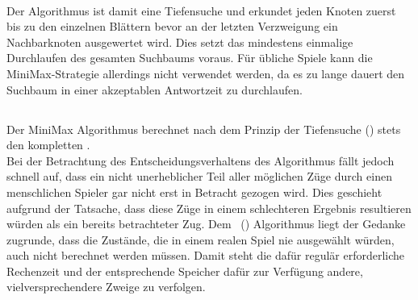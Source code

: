 \vspace{0.5cm}\\ Der Algorithmus ist damit eine Tiefensuche und erkundet jeden Knoten zuerst bis zu den einzelnen Blättern bevor an der letzten Verzweigung ein Nachbarknoten ausgewertet wird. Dies setzt das mindestens einmalige Durchlaufen des gesamten Suchbaums voraus. Für übliche Spiele kann die MiniMax-Strategie allerdings nicht verwendet werden, da es zu lange dauert den Suchbaum in einer akzeptablen Antwortzeit zu durchlaufen.

\subsection{\abab}
\label{ab-pruning}
Der MiniMax Algorithmus berechnet nach dem Prinzip der Tiefensuche () stets den kompletten \gtree. 
\\Bei der Betrachtung des Entscheidungsverhaltens des Algorithmus fällt jedoch schnell auf, dass ein nicht unerheblicher Teil aller möglichen Züge durch einen menschlichen Spieler gar nicht erst in Betracht gezogen wird. Dies geschieht aufgrund der Tatsache, dass diese Züge in einem schlechteren Ergebnis resultieren würden als ein bereits betrachteter Zug.\newline
Dem \abab\ (\abp) Algorithmus liegt der Gedanke zugrunde, dass die Zustände, die in einem realen Spiel nie ausgewählt würden, auch nicht berechnet werden müssen. Damit steht die dafür regulär erforderliche Rechenzeit und der entsprechende Speicher dafür zur Verfügung andere, vielversprechendere Zweige zu verfolgen.
